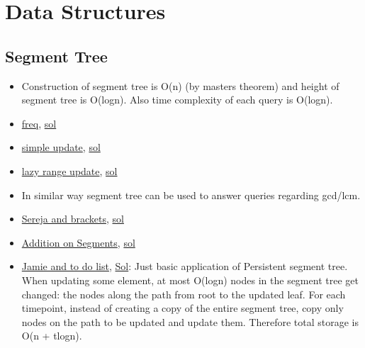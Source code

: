 \documentclass[8pt, a4paper, oneside, twocolumn]{extarticle}
\begin{document}
\section{Data Structures}
\subsection{Segment Tree}
\begin{itemize}
    \item Construction of segment tree is O(n) (by masters theorem) and height of segment tree is O(logn). Also time complexity of each query is O(logn).
    \item \href{https://uva.onlinejudge.org/external/112/11235.pdf}{freq}, \href{https://gist.github.com/sourabh2311/adf33f80e4b1e95bdb7d7a0e28ae23e6}{sol}
    \item \href{https://uva.onlinejudge.org/external/112/11297.pdf}{simple update}, \href{https://gist.github.com/sourabh2311/1376c934be55a72ca3f7c6f7481125ca}{sol}
    \item \href{https://uva.onlinejudge.org/external/114/11402.pdf}{lazy range update}, \href{https://github.com/sourabh2311/Competitive-Programming/blob/master/UVA_11402.cpp}{sol}
    \item In similar way segment tree can be used to answer queries regarding gcd/lcm.
    \item \href{https://codeforces.com/problemset/problem/380/C}{Sereja and brackets}, \href{https://github.com/sourabh2311/Competitive-Programming/blob/master/CF/Data%20Structures/Segment%20Tree/380C%20-%20Seraja%20And%20Brackets.cpp}{sol}
    \item \href{https://codeforces.com/problemset/problem/981/E}{Addition on Segments}, \href{https://github.com/sourabh2311/Competitive-Programming/blob/master/CF/Data%20Structures/Segment%20Tree/Problem%20-%20E%20Addition%20On%20Segments_sol_tourist.cpp}{sol}
    \item \href {https://codeforces.com/contest/916/problem/D}{Jamie and to do list}, \href {https://github.com/sourabh2311/Competitive-Programming/blob/master/CF/457D2/D.cpp}{Sol}: Just basic application of Persistent segment tree. When updating some element, at most O(logn) nodes in the segment tree get changed: the nodes along the path from root to the updated leaf. For each timepoint, instead of creating a copy of the entire segment tree, copy only nodes on the path to be updated and update them. Therefore total storage is O(n + t\*logn).
\end{itemize}
\end{document}
